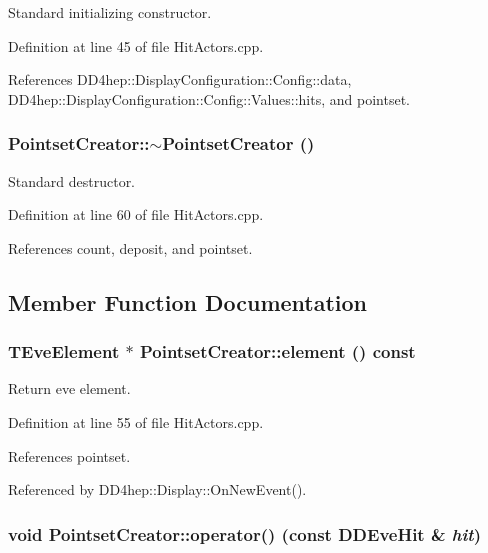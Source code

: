 Standard initializing constructor. 

Definition at line 45 of file HitActors.cpp.

References DD4hep::DisplayConfiguration::Config::data, DD4hep::DisplayConfiguration::Config::Values::hits, and pointset.\hypertarget{struct_d_d4hep_1_1_pointset_creator_a11cafd713490e23770130fa3f3c687bc}{
\subsubsection[{$\sim$PointsetCreator}]{\setlength{\rightskip}{0pt plus 5cm}PointsetCreator::$\sim$PointsetCreator ()}}
\label{struct_d_d4hep_1_1_pointset_creator_a11cafd713490e23770130fa3f3c687bc}


Standard destructor. 

Definition at line 60 of file HitActors.cpp.

References count, deposit, and pointset.

\subsection{Member Function Documentation}
\hypertarget{struct_d_d4hep_1_1_pointset_creator_afb8fff2acc59fb5716e60901bc65ff04}{
\subsubsection[{element}]{\setlength{\rightskip}{0pt plus 5cm}TEveElement $\ast$ PointsetCreator::element () const}}
\label{struct_d_d4hep_1_1_pointset_creator_afb8fff2acc59fb5716e60901bc65ff04}


Return eve element. 

Definition at line 55 of file HitActors.cpp.

References pointset.

Referenced by DD4hep::Display::OnNewEvent().\hypertarget{struct_d_d4hep_1_1_pointset_creator_ac17113e2952d438023d2b9d6a31d6e36}{
\subsubsection[{operator()}]{\setlength{\rightskip}{0pt plus 5cm}void PointsetCreator::operator() (const {\bf DDEveHit} \& {\em hit})}}
\label{struct_d_d4hep_1_1_pointset_creator_ac17113e2952d438023d2b9d6a31d6e36}


